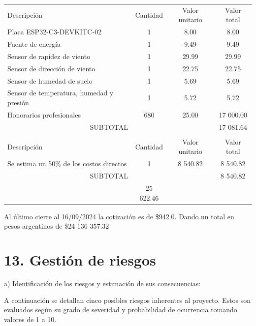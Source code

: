\documentclass[
11pt, %
]{charter}
\begin{document}
\begin{table}[htpb]
\centering
\begin{tabularx}{\linewidth}{@{}|X|c|c|c|@{}}
\hline
\rowcolor[HTML]{C0C0C0} 
\multicolumn{4}{|c|}{\cellcolor[HTML]{C0C0C0}COSTOS DIRECTOS} \\ \hline
\rowcolor[HTML]{C0C0C0} 
Descripción &
  \cellcolor[HTML]{C0C0C0}Cantidad &
  \cellcolor[HTML]{C0C0C0}Valor unitario &
  \cellcolor[HTML]{C0C0C0}Valor total \\ \hline
Placa ESP32-C3-DEVKITC-02 & 1 & 8.00 & 8.00 \\ \hline
Fuente de energía & 1 & 9.49 & 9.49 \\ \hline
Sensor de rapidez de viento & 1 & 29.99 & 29.99 \\ \hline
Sensor de dirección de viento & 1 & 22.75 & 22.75 \\ \hline
Sensor de humedad de suelo & 1 & 5.69 & 5.69 \\ \hline
Sensor de temperatura, humedad y presión & 1 & 5.72 & 5.72 \\ \hline
Honorarios profesionales & 680 & 25.00 & 17 000.00 \\ \hline
\multicolumn{3}{|c|}{SUBTOTAL} & 17 081.64 \\ \hline
\rowcolor[HTML]{C0C0C0} 
\multicolumn{4}{|c|}{\cellcolor[HTML]{C0C0C0}COSTOS INDIRECTOS} \\ \hline
\rowcolor[HTML]{C0C0C0} 
Descripción & Cantidad & Valor unitario & Valor total \\ \hline
Se estima un 50\% de los costos directos & 1 & 8 540.82 & 8 540.82 \\ \hline
\multicolumn{3}{|c|}{SUBTOTAL} & 8 540.82 \\ \hline
\rowcolor[HTML]{C0C0C0}
\multicolumn{3}{|c|}{TOTAL} & 25 622.46 \\ \hline
\end{tabularx}
\end{table}

Al último cierre al 16/09/2024 la cotización es de \$942.0. Dando un total en pesos argentinos de \$24 136 357.32

\section{13. Gestión de riesgos}
\label{sec:riesgos}

a) Identificación de los riesgos y estimación de sus consecuencias:

A continuación se detallan cinco posibles riesgos inherentes al proyecto. Estos son evaluados según su grado de severidad y probabilidad de ocurrencia tomando valores de 1 a 10.
 
\end{document}

